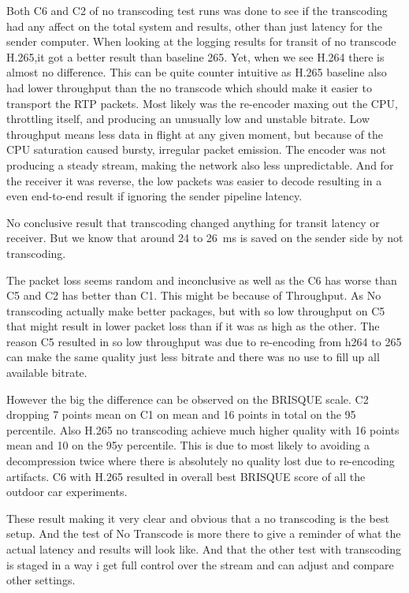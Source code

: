 Both C6 and C2 of no transcoding test runs was done to see if the transcoding had any affect on the total system and results, other than just latency for the sender computer. When looking at the logging results for transit of no transcode H.265,it got a better result than baseline 265. Yet, when we see H.264 there is almost no difference. This can be quite counter intuitive as H.265 baseline also had lower throughput than the no transcode which should make it easier to transport the RTP packets. Most likely was the re-encoder maxing out the CPU, throttling itself, and producing an unusually low and unstable bitrate. Low throughput means less data in flight at any given moment, but because of the CPU saturation caused bursty, irregular packet emission. The encoder was not producing a steady stream, making the network also less unpredictable.
And for the receiver it was reverse, the low packets was easier to decode resulting in a even end-to-end result if ignoring the sender pipeline latency.



No conclusive result that transcoding changed anything for transit latency or receiver. But we know that around 24 to 26~ms is saved on the sender side by not transcoding.

The packet loss seems random and inconclusive as well as the C6 has worse than C5 and C2 has better than C1. This might be because of Throughput. As No transcoding actually make better packages, but with so low throughput on C5 that might result in lower packet loss than if it was as high as the other. The reason C5 resulted in so low throughput was due to re-encoding from h264 to 265 can make the same quality just less bitrate and there was no use to fill up all available bitrate.

However the big the difference can be observed on the BRISQUE scale. C2 dropping 7 points mean on C1 on mean and 16 points in total on the 95 percentile. Also H.265 no transcoding achieve much higher quality with 16 points mean and 10 on the 95y  percentile. This is due to most likely to avoiding a decompression twice where there is absolutely no quality lost due to re-encoding artifacts. C6 with H.265 resulted in overall best BRISQUE score of all the outdoor car experiments. 

These result making it very clear and obvious that a no transcoding is the best setup. And the test of No Transcode is more there to give a reminder of what the actual latency and results will look like. And that the other test with transcoding is staged in a way i get full control over the stream and can adjust and compare other settings.

